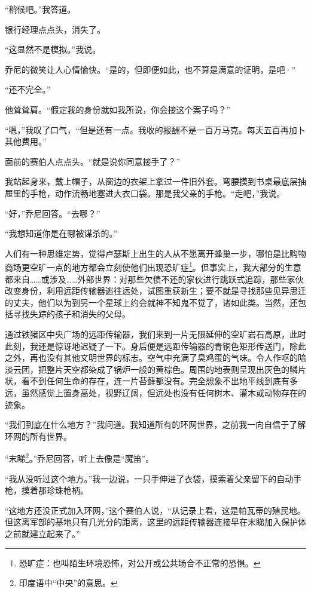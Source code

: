 \documentclass[AutoFakeBold=true]{book}
\begin{document}
``稍候吧。''我答道。

银行经理点点头，消失了。

``这显然不是模拟。''我说。

乔尼的微笑让人心情愉快。``是的，但即便如此，也不算是满意的证明，是吧·''

``还不完全。''

他耸耸肩。``假定我的身份就如我所说，你会接这个案子吗？''

``嗯，''我叹了口气，``但是还有一点。我收的报酬不是一百万马克。每天五百再加卜其他费用。''

面前的赛伯人点点头。``就是说你同意接手了？''

我站起身来，戴上帽子，从窗边的衣架上拿过一件旧外套。弯腰摸到书桌最底层抽屉里的手枪，动作流畅地塞进大衣口袋。那是我父亲的手枪。``走吧，''我说。

``好，''乔尼回答。``去哪？''

``我想知道你是在哪被谋杀的。''

\vspace*{1em}

人们有一种思维定势，觉得卢瑟斯上出生的人从不愿离开蜂巢一步，哪怕是比购物商场更空旷一点的地方都会立刻使他们出现恐旷症\footnote{恐旷症：也叫陌生环境恐怖，对公开或公共场合不正常的恐惧。}。但事实上，我大部分的生意都来自……或涉及……外部世界：对那些欠债不还的家伙进行跳跃式追踪，那些家伙改变身份，利用远距传输器逃往远处，试图重获新生；要不就是寻找那些见异思迁的丈夫，他们以为到另一个星球上约会就神不知鬼不觉了，诸如此类。当然，还包括寻找失踪的孩子和消失的父母。

通过铁猪区中央广场的远距传输器，我们来到一片无限延伸的空旷岩石高原，此时此刻，我还是惊讶地迟疑了一下。身后便是远距传输器的青铜色矩形传送门，除此之外，再也没有其他文明世界的标志。空气中充满了臭鸡蛋的气味。令人作呕的暗淡云团，把整片天空都染成了锅炉一般的黄棕色。周围的地表则呈现出灰色的鳞片状，看不到任何生命的存在，连一片苔藓都没有。完全想象不出地平线到底有多远，虽然感觉上置身高处，视野辽阔，但远处也没有任何树木、灌木或动物存在的迹象。

``我们到底在什么地方？''我问道。我知道所有的环网世界，之前我一向自信于了解环网的所有世界。

``末睇\footnote{印度语中``中央''的意思。}。''乔尼回答，听上去像是``魔笛''。

``我从没听过这个地方。''我一边说，一只手伸进了衣袋，摸索着父亲留下的自动手枪，摸着那珍珠枪柄。

``这地方还没正式加入环网，''这个赛伯人说，``从记录上看，这是帕瓦蒂的殖民地。但这离军部的基地只有几光分的距离，这里的远距传输器连接早在末睇加入保护体之前就建立起来了。''
\end{document}
